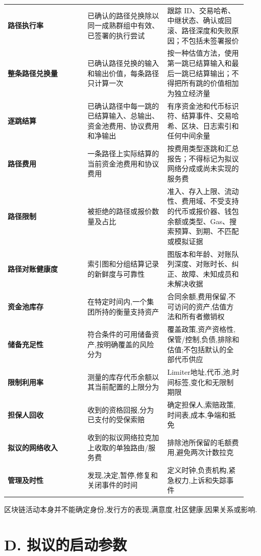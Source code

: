 \documentclass[11pt]{article}
\begin{document}
\begin{longtable}{P{0.31\linewidth} P{0.31\linewidth} P{0.31\linewidth}}
\textbf{路径执行率} & 已确认的路径兑换除以同一成熟群组中有效、已签署的执行尝试 & 跟踪 ID、交易哈希、中继状态、确认或回滚、路径深度和失败原因；不包括未签署报价 \\
\textbf{整条路径兑换量} & 已确认路径兑换的输入和输出价值，每条路径只计算一次 & 按一种估值方法，使用第一跳已结算输入和最后一跳已结算输出；不得把所有跳的价值相加为独立经济量 \\
\textbf{逐跳结算} & 已确认路径中每一跳的已结算输入、总输出、资金池费用、协议费用和净输出 & 有序资金池和代币标识符、结算事件、交易哈希、区块、日志索引和任何中间余量 \\
\textbf{路径费用} & 一条路径上实际结算的当前资金池费用和协议费用 & 按费用类型逐跳和汇总报告；不得标记为拟议网络分成或尚未实现的服务费 \\
\textbf{路径限制} & 被拒绝的路径或报价数量及占比 & 准入、存入上限、流动性、费用域、不受支持的代币或报价器、钱包余额或类型、Gas、搜索预算、到期、不匹配或模拟证据 \\
\textbf{路径对账健康度} & 索引图和分组结算记录的新鲜度与可靠性 & 图版本和年龄、对账队列深度、对账时长、纠正、故障、未知成员和未解决收据 \\
\textbf{资金池库存} & 在特定时间内,一个集团所持的衡量支持资产 & 合同余额,费用保留,不可访问的资产,估值方法和所有者撤销权 \\
\textbf{储备充足性} & 符合条件的可用储备资产,按明确覆盖的风险分为 & 覆盖政策,资产资格性,保管/控制,负债,排除和估值;不包括默认的全部代币供应 \\
\textbf{限制利用率} & 测量的库存代币余额以其当前配置的上限分为 & Limiter地址,代币,池,时间标签,变化和无限制期限 \\
\textbf{担保人回收} & 收到的资格回报,分为已支付的受保索赔 & 确定担保人,索赔政策,时间表,成本,争端和抵免 \\
\textbf{拟议的网络收入} & 收到的拟议网络拉克加上收取的单独路由/服务费 & 排除池所保留的毛额费用,避免两次计数拉克 \\
\textbf{管理及时性} & 发现,决定,暂停,修复和关闭事件的时间 & 定义时钟,负责机构,紧急权力,上诉和失踪事件 \\
\bottomrule
\end{longtable}

区块链活动本身并不能确定身份,发行方的表现,满意度,社区健康,因果关系或影响.


\section*{D. 拟议的启动参数}
\end{document}
